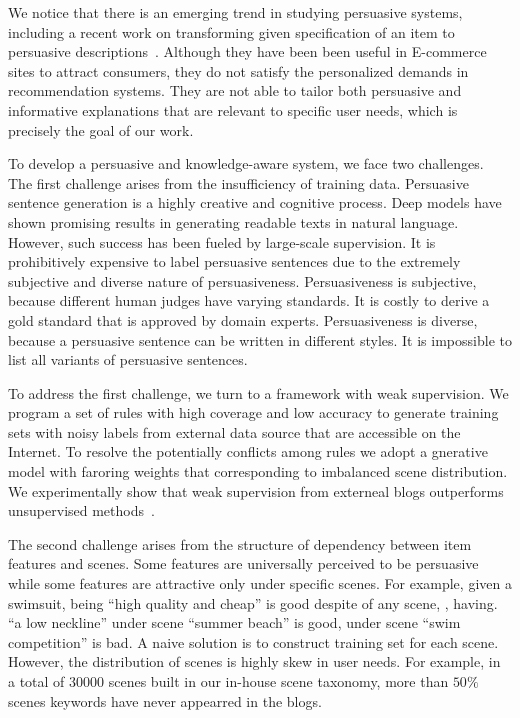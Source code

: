 \documentclass[sigconf]{acmart}
\begin{document}
We notice that there is an emerging trend in studying persuasive systems, including a recent work on transforming given specification of an item to persuasive descriptions~\cite{munigala2018persuaide}. Although they have been been useful in E-commerce sites to attract consumers, they do not satisfy the personalized demands in recommendation systems. They are not able to tailor both persuasive and informative explanations that are relevant to specific user needs, which is precisely the goal of our work.


To develop a persuasive and knowledge-aware system, we face two challenges.  The first challenge arises from the insufficiency of training data. Persuasive sentence generation is a highly creative and cognitive process. Deep models have shown promising results in generating readable texts in natural language. However, such success has been fueled by large-scale supervision. It is prohibitively expensive to label persuasive sentences due to the extremely subjective and diverse nature of persuasiveness. Persuasiveness is subjective, because different human judges have varying standards. It is costly to derive a gold standard that is approved by domain experts. Persuasiveness is diverse, because a persuasive sentence can be written in different styles.  It is impossible to list all variants of persuasive sentences.   
 
To address the first challenge, we turn to a framework with weak supervision. We program a set of rules with high coverage and low accuracy to generate training sets with noisy labels from external data source that are accessible on the Internet. To resolve the potentially conflicts among rules we adopt a gnerative model with faroring weights that corresponding to imbalanced scene distribution. We experimentally show that weak supervision from externeal blogs outperforms unsupervised methods~\cite{munigala2018persuaide}. %

The second challenge arises from the structure of dependency between item features and scenes. Some features are universally perceived to be persuasive while some features are attractive only under specific scenes. For example, given a swimsuit, being ``high quality and cheap'' is good despite of any scene, , having. ``a low neckline'' under scene ``summer beach'' is good, under scene ``swim competition'' is bad. 
A naive solution is to construct training set for each scene.
However, the distribution of scenes is highly skew in user needs. For example, in a total of $30000$ scenes built in our in-house scene taxonomy, more than $50\%$ scenes keywords have never appearred in the blogs. %
\end{document}
